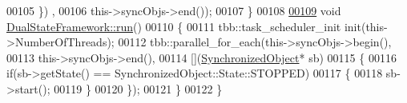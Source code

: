 \begin{DoxyCode}
00105                                              \}) ,
00106                               this->syncObjs->end());
00107     \}
00108     
\hypertarget{_dual_state_framework_8cpp_source_l00109}{}\hyperlink{classdsf_1_1_dual_state_framework_a25b6b35182320df2cf02a8505b1ff83b}{00109}     \textcolor{keywordtype}{void} \hyperlink{classdsf_1_1_dual_state_framework_a25b6b35182320df2cf02a8505b1ff83b}{DualStateFramework::run}()
00110     \{
00111         tbb::task\_scheduler\_init init(this->NumberOfThreads);
00112         tbb::parallel\_for\_each(this->syncObjs->begin(),
00113                                this->syncObjs->end(),
00114                                [](\hyperlink{classdsf_1_1_synchronized_object}{SynchronizedObject}* sb)
00115                                \{
00116                                    \textcolor{keywordflow}{if}(sb->getState() == SynchronizedObject::State::STOPPED)
00117                                    \{
00118                                        sb->start();
00119                                    \}
00120                                \});
00121     \}
00122 \}
\end{DoxyCode}
